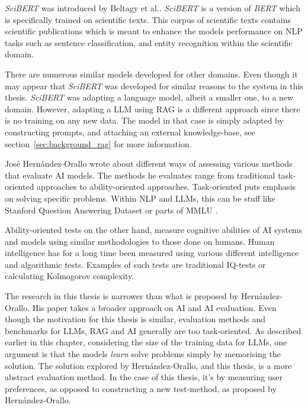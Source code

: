 

\textit{SciBERT} was introduced by Beltagy et al.\cite{beltagy_scibert_2019-1}. \textit{SciBERT} is a version of \textit{BERT} \cite{devlin_bert_2019-2} which is specifically trained on scientific texts. This corpus of scientific texts contains scientific publications which is meant to enhance the models performance on \gls{NLP} tasks such as sentence classification, and entity recognition within the scientific domain.


There are numerous similar models developed for other domains. Even though it may appear that \textit{SciBERT} was developed for similar reasons to the system in this thesis. \textit{SciBERT} was adapting a language model, albeit a smaller one, to a new domain. However, adapting a \gls{LLM} using \gls{RAG} is a different approach since there is no training on any new data. The model in that case is simply adapted by constructing prompts, and attaching an external knowledge-base, see section~\ref{sec:background_rag} for more information.




José Hernández-Orallo wrote\cite{hernandez-orallo_evaluation_2017} about different ways of assessing various methods that evaluate AI models. The methods he evaluates range from traditional task-oriented approaches to ability-oriented approaches. Task-oriented puts emphasis on solving specific problems. Within \gls{NLP} and \gls{LLM}s, this can be stuff like Stanford Question Answering Dataset \cite{rajpurkar_squad_2016} or parts of \gls{MMLU} \cite{hendrycks_measuring_2020}.


Ability-oriented tests on the other hand, measure cognitive abilities of AI systems and models using similar methodologies to those done on humans. Human intelligence has for a long time been measured using various different intelligence and algorithmic tests. Examples of such tests are traditional IQ-tests or calculating Kolmogorov complexity.


The research in this thesis is narrower than what is proposed by Hernández-Orallo. His paper takes a broader approach on AI and AI evaluation. Even though the motivation for this thesis is similar, evaluation methods and benchmarks for \gls{LLM}s, \gls{RAG} and AI generally are too task-oriented. As described earlier in this chapter, considering the size of the training data for \gls{LLM}s, one argument is that the models \textit{learn} solve problems simply by memorising the solution. The solution explored by Hernández-Orallo, and this thesis, is a more abstract evaluation method. In the case of this thesis, it’s by measuring user preferences, as opposed to constructing a new test-method, as proposed by Hernández-Orallo.


